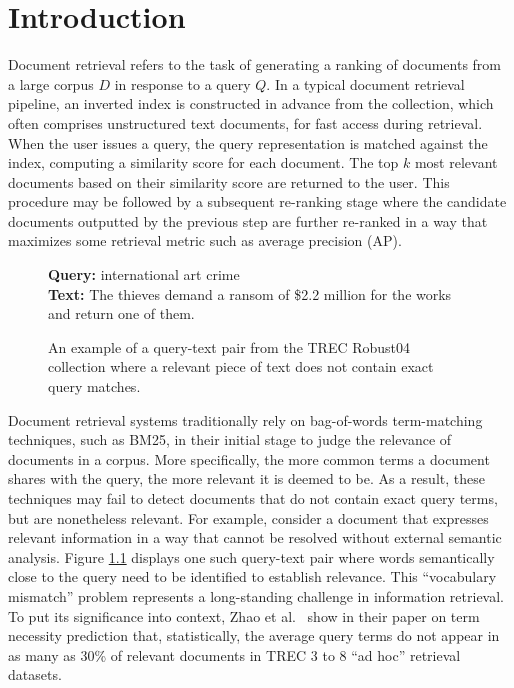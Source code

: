 \chapter{Introduction}
\label{intro}

Document retrieval refers to the task of generating a ranking of documents from a large corpus $ D $ in response to a query $ Q $.
In a typical document retrieval pipeline, an inverted index is constructed in advance from the collection, which often comprises unstructured text documents, for fast access during retrieval.
When the user issues a query, the query representation is matched against the index, computing a similarity score for each document.
The top $ k $ most relevant documents based on their similarity score are returned to the user.
This procedure may be followed by a subsequent re-ranking stage where the candidate documents outputted by the previous step are further re-ranked in a way that maximizes some retrieval metric such as average precision (AP).

\begin{figure}[b!]
	\begin{framed}
    		\textbf{Query:} international art crime \\
    		\textbf{Text:} The thieves demand a ransom of \$2.2 million for the works and return one of them.
	\end{framed}
\label{query-sent-example}
 \caption{An example of a query-text pair from the TREC Robust04 collection where a relevant piece of text does not contain exact query matches.}
\end{figure}

Document retrieval systems traditionally rely on bag-of-words term-matching techniques, such as BM25, in their initial stage to judge the relevance of documents in a corpus.
More specifically, the more common terms a document shares with the query, the more relevant it is deemed to be.
As a result, these techniques may fail to detect documents that do not contain exact query terms, but are nonetheless relevant.
For example, consider a document that expresses relevant information in a way that cannot be resolved without external semantic analysis.
Figure \ref{query-sent-example} displays one such query-text pair where words semantically close to the query need to be identified to establish relevance.
This ``vocabulary mismatch'' problem represents a long-standing challenge in information retrieval.
To put its significance into context, Zhao et al.~\cite{zhao2010term} show in their paper on term necessity prediction that, statistically, the average query terms do not appear in as many as 30\% of relevant documents in TREC 3 to 8 ``ad hoc'' retrieval datasets.

